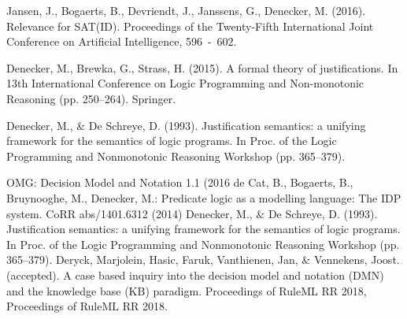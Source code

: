 \documentclass{IOS-Book-Article}     %
\begin{document}
\begin{thebibliography}{99}

Jansen, J., Bogaerts, B., Devriendt, J., Janssens, G.,  Denecker, M. (2016). Relevance for SAT(ID). Proceedings of the Twenty-Fifth International Joint Conference on Artificial Intelligence, 596~-~602.

Denecker, M., Brewka, G., Strass, H. (2015). A formal theory of justifications. In 13th International Conference on Logic Programming and Non-monotonic Reasoning (pp. 250–264). Springer.

Denecker, M., \& De Schreye, D. (1993). Justification semantics: a unifying framework for the semantics of logic programs. In Proc. of the Logic Programming and Nonmonotonic Reasoning Workshop (pp. 365–379).

OMG: Decision Model and Notation 1.1 (2016
 de  Cat,  B.,  Bogaerts,  B.,  Bruynooghe,  M.,  Denecker,  M.:   Predicate  logic  as  a
modelling language: The IDP system.  CoRR
abs/1401.6312
(2014)
Denecker, M., \& De Schreye, D. (1993). Justification semantics: a unifying framework for the semantics of logic programs. In Proc. of the Logic Programming and Nonmonotonic Reasoning Workshop (pp. 365–379).
Deryck, Marjolein, Hasic, Faruk, Vanthienen, Jan, \& Vennekens, Joost. (accepted). A case based inquiry into the decision model and notation (DMN) and the knowledge base (KB) paradigm. Proceedings of RuleML RR 2018, Proceedings of RuleML RR 2018.


\end{thebibliography}
\end{document}

